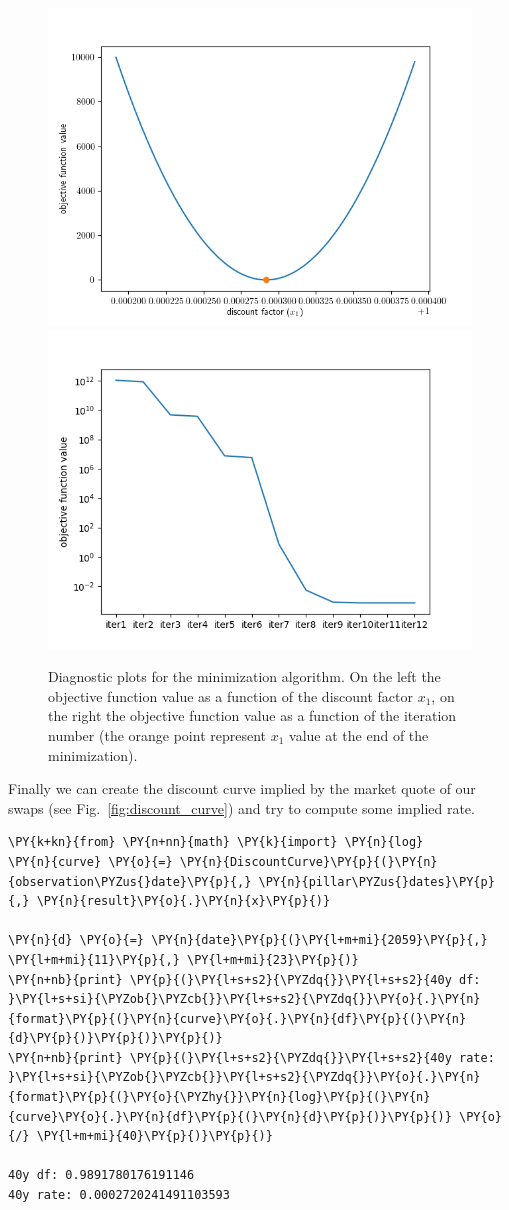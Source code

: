 \begin{figure}[htb]
  \centering
  \includegraphics[width=0.45\linewidth]{obj_func.png}
  \includegraphics[width=0.45\linewidth]{obj_func_iter.png}
  \caption{Diagnostic plots for the minimization algorithm. On the left the objective function value as a function of the discount factor $x_1$, on the right the objective function value as a function of the iteration number (the orange point represent $x_1$ value at the end of the minimization).}
  \label{fig:minimization_diagnostic}
\end{figure}

Finally we can create the discount curve implied by the market quote of
our swaps (see Fig.~\ref{fig:discount_curve}) and try to compute some implied rate.

\begin{tcolorbox}[breakable, size=fbox, boxrule=1pt, pad at break*=1mm,colback=cellbackground, colframe=cellborder]
\begin{Verbatim}[commandchars=\\\{\}]
\PY{k+kn}{from} \PY{n+nn}{math} \PY{k}{import} \PY{n}{log}
\PY{n}{curve} \PY{o}{=} \PY{n}{DiscountCurve}\PY{p}{(}\PY{n}{observation\PYZus{}date}\PY{p}{,} \PY{n}{pillar\PYZus{}dates}\PY{p}{,} \PY{n}{result}\PY{o}{.}\PY{n}{x}\PY{p}{)}

\PY{n}{d} \PY{o}{=} \PY{n}{date}\PY{p}{(}\PY{l+m+mi}{2059}\PY{p}{,} \PY{l+m+mi}{11}\PY{p}{,} \PY{l+m+mi}{23}\PY{p}{)}
\PY{n+nb}{print} \PY{p}{(}\PY{l+s+s2}{\PYZdq{}}\PY{l+s+s2}{40y df: }\PY{l+s+si}{\PYZob{}\PYZcb{}}\PY{l+s+s2}{\PYZdq{}}\PY{o}{.}\PY{n}{format}\PY{p}{(}\PY{n}{curve}\PY{o}{.}\PY{n}{df}\PY{p}{(}\PY{n}{d}\PY{p}{)}\PY{p}{)}\PY{p}{)}
\PY{n+nb}{print} \PY{p}{(}\PY{l+s+s2}{\PYZdq{}}\PY{l+s+s2}{40y rate: }\PY{l+s+si}{\PYZob{}\PYZcb{}}\PY{l+s+s2}{\PYZdq{}}\PY{o}{.}\PY{n}{format}\PY{p}{(}\PY{o}{\PYZhy{}}\PY{n}{log}\PY{p}{(}\PY{n}{curve}\PY{o}{.}\PY{n}{df}\PY{p}{(}\PY{n}{d}\PY{p}{)}\PY{p}{)} \PY{o}{/} \PY{l+m+mi}{40}\PY{p}{)}\PY{p}{)}             

40y df: 0.9891780176191146
40y rate: 0.0002720241491103593
    \end{Verbatim}
\end{tcolorbox}

